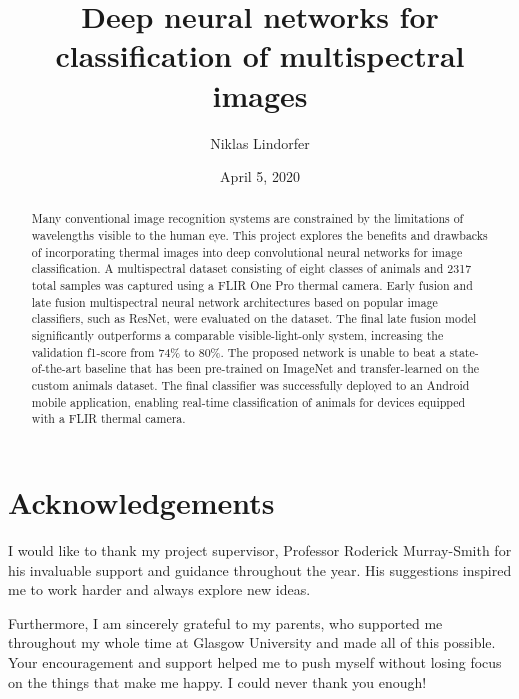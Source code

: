 \documentclass{l4proj}
\begin{document}
\title{Deep neural networks for classification of multispectral images}
\author{Niklas Lindorfer}
\date{April 5, 2020}

\maketitle

\begin{abstract}
    Many conventional image recognition systems are constrained by the limitations of wavelengths visible to the human eye.
    This project explores the benefits and drawbacks of incorporating thermal images into deep convolutional neural networks for image classification. A multispectral dataset consisting of eight classes of animals and 2317 total samples was captured using a FLIR One Pro thermal camera.
    Early fusion and late fusion multispectral neural network architectures based on popular image classifiers, such as ResNet, were evaluated on the dataset.
    The final late fusion model significantly outperforms a comparable visible-light-only system, increasing the validation f1-score from 74\% to 80\%. The proposed network is unable to beat a state-of-the-art baseline that has been pre-trained on ImageNet and transfer-learned on the custom animals dataset.
    The final classifier was successfully deployed to an Android mobile application, enabling real-time classification of animals for devices equipped with a FLIR thermal camera.
\end{abstract}

\chapter*{Acknowledgements}
\thispagestyle{empty}

I would like to thank my project supervisor, Professor Roderick Murray-Smith for his invaluable support and guidance throughout the year. His suggestions inspired me to work harder and always explore new ideas.

Furthermore, I am sincerely grateful to my parents, who supported me throughout my whole time at Glasgow University and made all of this possible. Your encouragement and support helped me to push myself without losing focus on the things that make me happy. I could never thank you enough!
\end{document}
